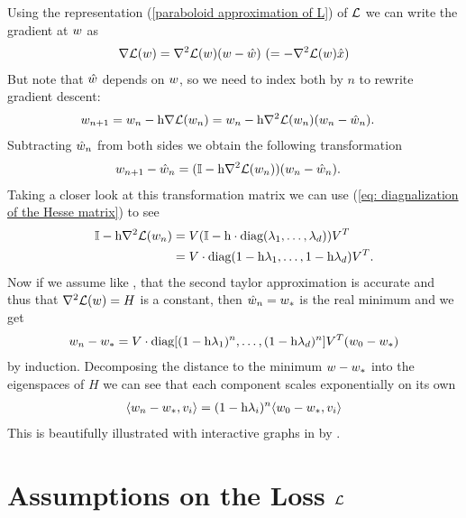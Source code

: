 Using the representation (\ref{paraboloid approximation of L}) of \(\mathcal{L}\) we
can write the gradient at \(w\) as
%
\begin{align}\label{eq: hesse representation of gradient}
	\nabla \mathcal{L}(w)
	=  \nabla^2 \mathcal{L}(w)(w-\hat{w})
	\ (= -\nabla^2 \mathcal{L}(w)\hat{x})
\end{align}
%
But note that \(\hat{w}\) depends on \(w\), so we need to index both
by \(n\) to rewrite gradient descent:
%
\begin{align*}
	w_{n+1} &= w_n - \text{h}\nabla \mathcal{L}(w_n)
	= w_n - \text{h}\nabla^2 \mathcal{L}(w_n)(w_n - \hat{w}_n).
\end{align*}
%
Subtracting \(\hat{w}_n\) from both sides we obtain the following
transformation 
%
\begin{align}\label{eq: Matrix GD Formulation}
	w_{n+1} - \hat{w}_n
	&= (\mathbb{I} - \text{h}\nabla^2 \mathcal{L}(w_n) ) (w_n - \hat{w}_n).
\end{align}
%
Taking a closer look at this transformation matrix we can use (\ref{eq:
diagnalization of the Hesse matrix}) to see
%
\begin{align*}
	\mathbb{I} - \text{h}\nabla^2 \mathcal{L}(w_n)
	&= V(\mathbb{I} - \text{h}\cdot\text{diag}(\lambda_1,\dots,\lambda_d) )V^T \\
	&= V\cdot\text{diag}(1-\text{h}\lambda_1, \dots,1-\text{h}\lambda_d)V^T.
\end{align*}
%
Now if we assume like \textcite{gohWhyMomentumReally2017}, that the second
taylor approximation is accurate and thus that \(\nabla^2 \mathcal{L}(w)=H\) is a
constant, then \(\hat{w}_n = w_*\) is the real minimum and we get
%
\begin{align}
	w_n - w_*
	= V\cdot\text{diag}[(1-\text{h}\lambda_1)^n,\dots,(1-\text{h}\lambda_d)^n] V^T (w_0 - w_*)
\end{align}
%
by induction. Decomposing the distance to the minimum \(w - w_*\)
into the eigenspaces of \(H\) we can see that each component scales
exponentially on its own 
%
\begin{align*}
	\langle w_n -w_*, v_i\rangle
	= (1-\text{h}\lambda_i)^n \langle w_0 - w_*, v_i\rangle
\end{align*}
%
This is beautifully illustrated with interactive graphs in
 by \citeauthor{gohWhyMomentumReally2017}.

\section{Assumptions on the Loss \texorpdfstring{\(\mathcal{L}\)}{ℒ}}

